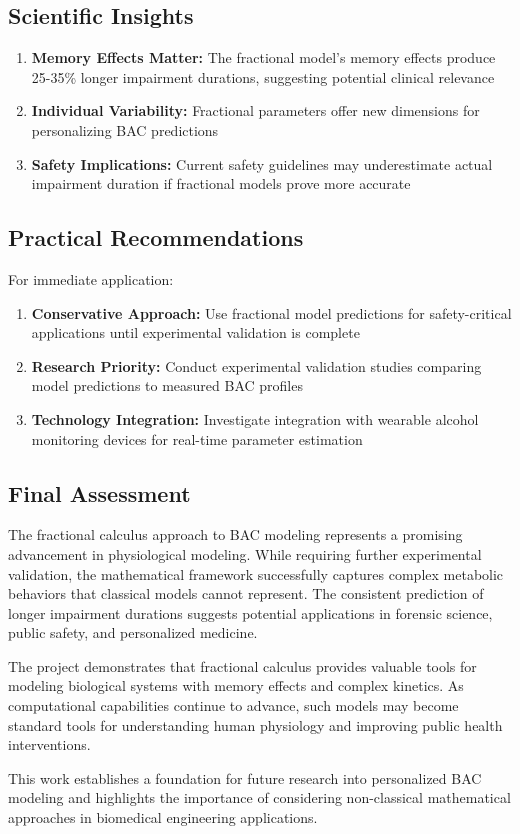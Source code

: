 \documentclass[12pt]{article}
\begin{document}
\subsection{Scientific Insights}

\begin{enumerate}
    \item \textbf{Memory Effects Matter:} The fractional model's memory effects produce 25-35\% longer impairment durations, suggesting potential clinical relevance
    
    \item \textbf{Individual Variability:} Fractional parameters offer new dimensions for personalizing BAC predictions
    
    \item \textbf{Safety Implications:} Current safety guidelines may underestimate actual impairment duration if fractional models prove more accurate
\end{enumerate}

\subsection{Practical Recommendations}

For immediate application:
\begin{enumerate}
    \item \textbf{Conservative Approach:} Use fractional model predictions for safety-critical applications until experimental validation is complete
    
    \item \textbf{Research Priority:} Conduct experimental validation studies comparing model predictions to measured BAC profiles
    
    \item \textbf{Technology Integration:} Investigate integration with wearable alcohol monitoring devices for real-time parameter estimation
\end{enumerate}

\subsection{Final Assessment}

The fractional calculus approach to BAC modeling represents a promising advancement in physiological modeling. While requiring further experimental validation, the mathematical framework successfully captures complex metabolic behaviors that classical models cannot represent. The consistent prediction of longer impairment durations suggests potential applications in forensic science, public safety, and personalized medicine.

The project demonstrates that fractional calculus provides valuable tools for modeling biological systems with memory effects and complex kinetics. As computational capabilities continue to advance, such models may become standard tools for understanding human physiology and improving public health interventions.

This work establishes a foundation for future research into personalized BAC modeling and highlights the importance of considering non-classical mathematical approaches in biomedical engineering applications.
\end{document}
